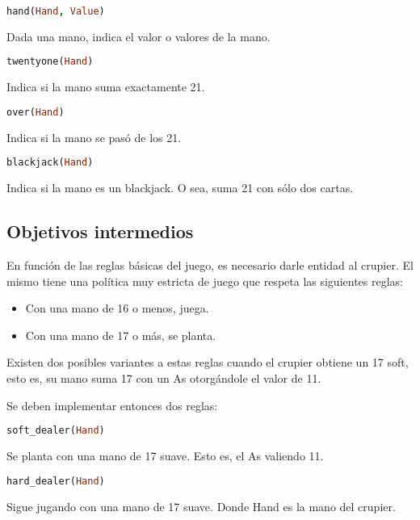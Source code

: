 \documentclass[12pt]{report}
\begin{document}
\begin{lstlisting}[language=Prolog]
hand(Hand, Value)
\end{lstlisting}

Dada una mano, indica el valor o valores de la mano.

\begin{lstlisting}[language=Prolog]
twentyone(Hand)
\end{lstlisting}

Indica si la mano suma exactamente 21.  

\begin{lstlisting}[language=Prolog]
over(Hand)
\end{lstlisting}

Indica si la mano se pasó de los 21.  

\begin{lstlisting}[language=Prolog]
blackjack(Hand)
\end{lstlisting}

Indica si la mano es un blackjack. O sea, suma 21 con sólo dos cartas.


\subsection*{Objetivos intermedios}
En función de las reglas básicas del juego, es necesario darle entidad al crupier. El mismo tiene una política muy estricta de juego que respeta las siguientes reglas:
\begin{itemize}
    \item Con una mano de 16 o menos, juega.
    \item Con una mano de 17 o más, se planta.
\end{itemize}

Existen dos posibles variantes a estas reglas cuando el crupier obtiene un 17 soft, esto es, su mano suma 17 con un As otorgándole el valor de 11. 

Se deben implementar entonces dos reglas:

\begin{lstlisting}[language=Prolog]
soft_dealer(Hand)
\end{lstlisting}

Se planta con una mano de 17 suave. Esto es, el As valiendo 11.

\begin{lstlisting}[language=Prolog]
hard_dealer(Hand)
\end{lstlisting}

Sigue jugando con una mano de 17 suave.
Donde Hand es la mano del crupier.
\end{document}

